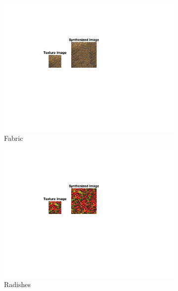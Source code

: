 \documentclass[10pt,twocolumn,letterpaper]{article}
\begin{document}
\begin{figure}
   \begin{subfigure}[h]{0.33\textwidth}
         \centering
         \includegraphics[trim={4.5cm 7cm 8.0cm 3cm}, clip, scale=1.5, width=\textwidth]{../results/syn_final/result_fabric_B_40.png}
         \caption{Fabric}
         \label{fig:apple_res}
     \end{subfigure}
     \hfill
     \begin{subfigure}[h]{0.33\textwidth}
        \centering
        \includegraphics[trim={4.5cm 7cm 8.0cm 3cm}, clip, scale=1.5, width=\textwidth]{../results/syn_final/result_radishes_B_40.png}
        \caption{Radishes}
        \label{fig:apple_res}
    \end{subfigure}
    \hfill
    \begin{subfigure}[h]{0.33\textwidth}

\end{subfigure}
\end{figure}
\end{document}
